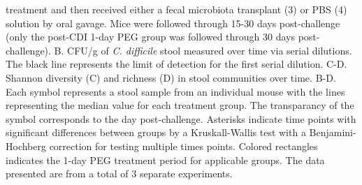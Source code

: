 \documentclass[
  11pt,
]{article}
\begin{document}
treatment and then received either a fecal microbiota transplant (3) or
PBS (4) solution by oral gavage. Mice were followed through 15-30 days
post-challenge (only the post-CDI 1-day PEG group was followed through
30 days post-challenge). B. CFU/g of \emph{C. difficile} stool measured
over time via serial dilutions. The black line represents the limit of
detection for the first serial dilution. C-D. Shannon diversity (C) and
richness (D) in stool communities over time. B-D. Each symbol represents
a stool sample from an individual mouse with the lines representing the
median value for each treatment group. The transparancy of the symbol
corresponds to the day post-challenge. Asterisks indicate time points
with significant differences between groups by a Kruskall-Wallis test
with a Benjamini-Hochberg correction for testing multiple times points.
Colored rectangles indicates the 1-day PEG treatment period for
applicable groups. The data presented are from a total of 3 separate
experiments. \newpage
\end{document}
